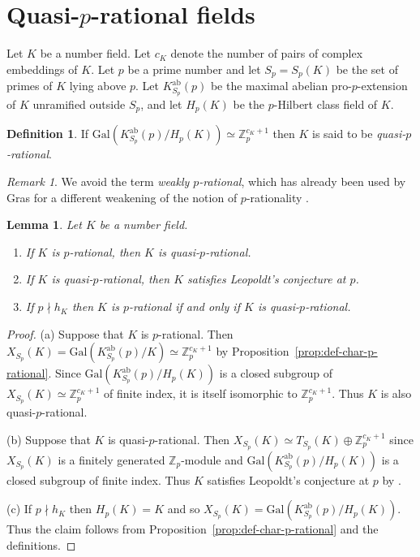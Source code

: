 \documentclass[12pt, a4paper, usenames]{amsart}
\newcommand{\Z}{\mathbb{Z}}
\theoremstyle{plain}
\newtheorem{lemma}[theorem]{Lemma}
\theoremstyle{remark}
\newtheorem{remark}[theorem]{Remark}
\theoremstyle{definition}
\newtheorem{definition}[theorem]{Definition}
\newcommand{\Gal}{\mathrm{Gal}}
\begin{document}
\section{Quasi-$p$-rational fields}\label{sec:quasi-p-rationality}

Let $K$ be a number field.
Let $c_{K}$ denote the number of pairs of complex embeddings of $K$.
Let $p$ be a prime number and let $S_{p}=S_{p}(K)$ be the set of primes of $K$ 
lying above $p$. 
Let $K_{S_{p}}^{\mathrm{ab}}(p)$ be the 
maximal abelian pro-$p$-extension of $K$ unramified outside $S_{p}$, 
and let $H_{p}(K)$ be the $p$-Hilbert class field of $K$. 

\begin{definition}\label{def:weak-p-rat}
If $\Gal(K_{S_{p}}^{\mathrm{ab}}(p)/H_{p}(K)) \simeq \Z_{p}^{c_{K}+1}$
then $K$ is said to be \textit{quasi-$p$-rational}.
\end{definition}

\begin{remark}
We avoid the term \emph{weakly $p$-rational}, which has already been used by Gras for a different weakening of the notion of $p$-rationality \cite[\S 3.2]{MR3320496}.
\end{remark}


\begin{lemma}\label{lem:rat-implies-quasi-rat-implies-leopoldt}
Let $K$ be a number field.
\begin{enumerate}
    \item If $K$ is $p$-rational, then $K$ is quasi-$p$-rational.
    \item If $K$ is quasi-$p$-rational, then $K$ satisfies Leopoldt's conjecture at $p$. 
    \item If $p \nmid h_{K}$ then $K$ is $p$-rational if and only if $K$ is quasi-$p$-rational.
\end{enumerate}
\end{lemma}

\begin{proof}
(a) Suppose that $K$ is $p$-rational. Then 
$X_{S_{p}}(K) = \Gal(K_{S_{p}}^{\mathrm{ab}}(p)/K) \simeq \Z_{p}^{c_{K}+1}$
by Proposition~\ref{prop:def-char-p-rational}.
Since $\Gal(K_{S_{p}}^{\mathrm{ab}}(p)/H_{p}(K))$
is a closed subgroup of $X_{S_{p}}(K) \simeq \Z_{p}^{c_{K}+1}$ of finite index,
it is itself isomorphic to $\Z_{p}^{c_{K}+1}$.
Thus $K$ is also quasi-$p$-rational.

(b) Suppose that $K$ is quasi-$p$-rational. 
Then $X_{S_{p}}(K) \simeq T_{S_p}(K) \oplus \Z_{p}^{c_{K}+1}$ 
since $X_{S_{p}}(K)$ is a finitely generated $\Z_{p}$-module
and $\Gal(K_{S_{p}}^{\mathrm{ab}}(p)/H_{p}(K))$
is a closed subgroup of finite index.
Thus $K$ satisfies Leopoldt's conjecture at $p$ by \cite[(10.3.20)(ii)]{MR2392026}.

(c) If $p \nmid h_{K}$ then $H_{p}(K)=K$ and so $X_{S_{p}}(K) = \Gal(K_{S_{p}}^{\mathrm{ab}}(p)/H_{p}(K))$. Thus the claim follows from 
Proposition~\ref{prop:def-char-p-rational} and the definitions.
\end{proof}
\end{document}
